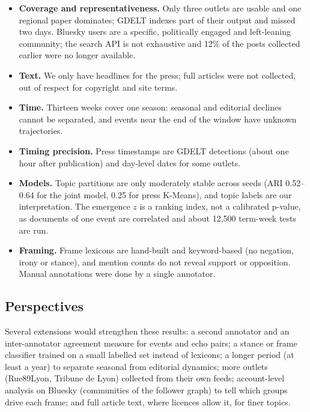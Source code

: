 \documentclass[pdflatex,sn-mathphys-num]{sn-jnl}
\begin{document}
\begin{itemize}
\item \textbf{Coverage and representativeness.} Only three outlets are usable and one regional paper dominates; GDELT indexes part of their output and missed two days. Bluesky users are a specific, politically engaged and left-leaning community; the search API is not exhaustive and 12\% of the posts collected earlier were no longer available.
\item \textbf{Text.} We only have headlines for the press; full articles were not collected, out of respect for copyright and site terms.
\item \textbf{Time.} Thirteen weeks cover one season: seasonal and editorial declines cannot be separated, and events near the end of the window have unknown trajectories.
\item \textbf{Timing precision.} Press timestamps are GDELT detections (about one hour after publication) and day-level dates for some outlets.
\item \textbf{Models.} Topic partitions are only moderately stable across seeds (ARI 0.52--0.64 for the joint model, 0.25 for press K-Means), and topic labels are our interpretation. The emergence $z$ is a ranking index, not a calibrated p-value, as documents of one event are correlated and about 12,500 term-week tests are run.
\item \textbf{Framing.} Frame lexicons are hand-built and keyword-based (no negation, irony or stance), and mention counts do not reveal support or opposition. Manual annotations were done by a single annotator.
\end{itemize}

\subsection*{Perspectives}

Several extensions would strengthen these results: a second annotator and an inter-annotator agreement measure for events and echo pairs; a stance or frame classifier trained on a small labelled set instead of lexicons; a longer period (at least a year) to separate seasonal from editorial dynamics; more outlets (Rue89Lyon, Tribune de Lyon) collected from their own feeds; account-level analysis on Bluesky (communities of the follower graph) to tell which groups drive each frame; and full article text, where licences allow it, for finer topics.

\backmatter
\end{document}
